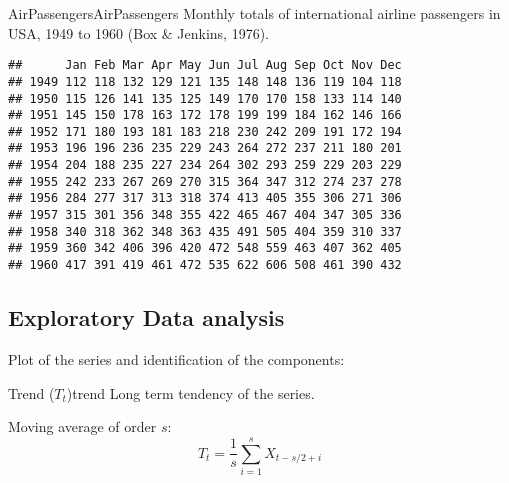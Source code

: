 \begin{example}{AirPassengers}{AirPassengers}
	Monthly totals of international airline passengers in USA, 1949
	to 1960 (Box \& Jenkins, 1976).
	\begin{verbatim}
##      Jan Feb Mar Apr May Jun Jul Aug Sep Oct Nov Dec
## 1949 112 118 132 129 121 135 148 148 136 119 104 118
## 1950 115 126 141 135 125 149 170 170 158 133 114 140
## 1951 145 150 178 163 172 178 199 199 184 162 146 166
## 1952 171 180 193 181 183 218 230 242 209 191 172 194
## 1953 196 196 236 235 229 243 264 272 237 211 180 201
## 1954 204 188 235 227 234 264 302 293 259 229 203 229
## 1955 242 233 267 269 270 315 364 347 312 274 237 278
## 1956 284 277 317 313 318 374 413 405 355 306 271 306
## 1957 315 301 356 348 355 422 465 467 404 347 305 336
## 1958 340 318 362 348 363 435 491 505 404 359 310 337
## 1959 360 342 406 396 420 472 548 559 463 407 362 405
## 1960 417 391 419 461 472 535 622 606 508 461 390 432
\end{verbatim}
	\begin{nscenter}
	\end{nscenter}
\end{example}

\subsection{Exploratory Data analysis}

Plot of the series and identification of the components:

\begin{definition}{Trend ($T_t$)}{trend}
	Long term tendency of the series.

	Moving average of order $s$:
	\begin{equation*}
		T_t = \frac{1}{s} \sum_{i=1}^s X_{t-s/2+i}
	\end{equation*}
\end{definition}

